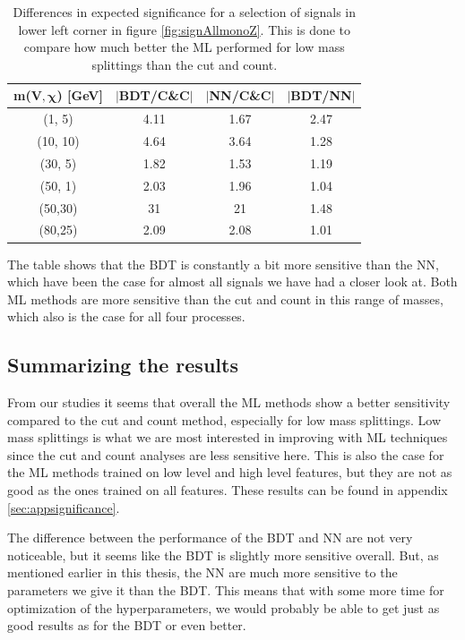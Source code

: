 \begin{table}[H]
    \centering
    \begin{tabular}{c c c c}
    \toprule
    \textbf{m($\mathbf{V, \chi}$) [GeV]} & \textbf{$|$BDT/C\&C$|$} & \textbf{$|$NN/C\&C$|$} &\textbf{$|$BDT/NN$|$}\\
    \midrule
    \midrule
        (1, 5)      & 4.11      & 1.67      & 2.47  \\
        (10, 10)    & 4.64      & 3.64      & 1.28  \\
        (30, 5)     & 1.82      & 1.53      & 1.19  \\  
        (50, 1)     & 2.03      & 1.96      & 1.04  \\
        (50,30)     & 31        & 21        & 1.48  \\
        (80,25)     & 2.09      & 2.08      & 1.01  \\
    \bottomrule
    \end{tabular}
    \caption{Differences in expected significance for a selection of signals in lower left corner in figure \ref{fig:signAllmonoZ}. This is done to compare how much better the ML performed for low mass splittings than the cut and count.}
    \label{tab:diffmonoZ}
\end{table}

The table shows that the BDT is constantly a bit more sensitive than the NN, which have been the case for almost all signals we have had a closer look at. Both ML methods are more sensitive than the cut and count in this range of masses, which also is the case for all four processes.







\subsection{Summarizing the results}
From our studies it seems that overall the ML methods show a better sensitivity compared to the cut and count method, especially for low mass splittings. Low mass splittings is what we are most interested in improving with ML techniques since the cut and count analyses are less sensitive here. This is also the case for the ML methods trained on low level and high level features, but they are not as good as the ones trained on all features. These results can be found in appendix \ref{sec:appsignificance}. 

The difference between the performance of the BDT and NN are not very noticeable, but it seems like the BDT is slightly more sensitive overall. But, as mentioned earlier in this thesis, the NN are much more sensitive to the parameters we give it than the BDT. This means that with some more time for optimization of the hyperparameters, we would probably be able to get just as good results as for the BDT or even better.

